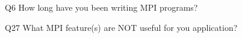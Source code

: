 \begin{description}%
\item{Q6} How long have you been writing MPI programs?%
\item{Q27} What MPI feature(s) are NOT useful for you application?%
\end{description}%

